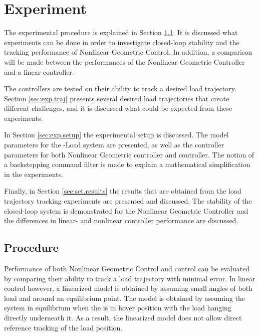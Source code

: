 \chapter{Experiment}\label{ch:exp}
The experimental procedure is explained in Section \ref{sec:exp.proc}. 
It is discussed what experiments can be done in order to investigate closed-loop stability and the tracking performance of Nonlinear Geometric Control.
In addition, a comparison will be made between the performances of the Nonlinear Geometric Controller and a linear  controller.

The controllers are tested on their ability to track a desired load trajectory. 
Section \ref{sec:exp.traj} presents several desired load trajectories that create different challenges, and it is discussed what could be expected from these experiments.

In Section \ref{sec:exp.setup} the experimental setup is discussed. 
The model parameters for the -Load system are presented, as well as the controller parameters for both Nonlinear Geometric controller and  controller.
The notion of a backstepping command filter is made to explain a mathematical simplification in the experiments.

Finally, in Section \ref{sec:set.results} the results that are obtained from the load trajectory tracking experiments are presented and discussed.
The stability of the closed-loop system is demonstrated for the Nonlinear Geometric Controller and the differences in linear- and nonlinear controller performance are discussed.

\newpage
\section{Procedure}\label{sec:exp.proc}
Performance of both Nonlinear Geometric Control and  control can be evaluated by comparing their ability to track a load trajectory with minimal error. 
In linear control however, a linearized model is obtained by assuming small angles of both load and  around an equilibrium point. 
The model is obtained by assuming the system in equilibrium when the  is in hover position with the load hanging directly underneath it.
As a result, the linearized model does not allow direct reference tracking of the load position. 


